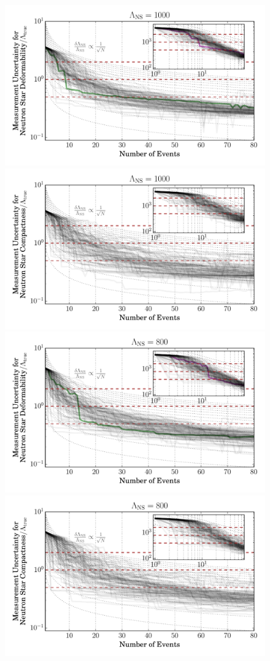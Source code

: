 \documentclass[aps,prd,amsmath,floats,floatfix, twocolumn,
superscriptaddress,nofootinbib,showpacs]{revtex4-1}
\begin{document}
\begin{figure}
\includegraphics[width=0.8\columnwidth]{plots/LambdaCIWidths_vs_N_AllPopulations_Log_L1000.pdf}
\includegraphics[width=0.8\columnwidth]{plots/LambdaCIWidths_vs_N_AstroPopulations_Log_L1000.pdf}\\
\includegraphics[width=0.8\columnwidth]{plots/LambdaCIWidths_vs_N_AllPopulations_Log_L800.pdf}
\includegraphics[width=0.8\columnwidth]{plots/LambdaCIWidths_vs_N_AstroPopulations_Log_L800.pdf}\\

\end{figure}
\end{document}

